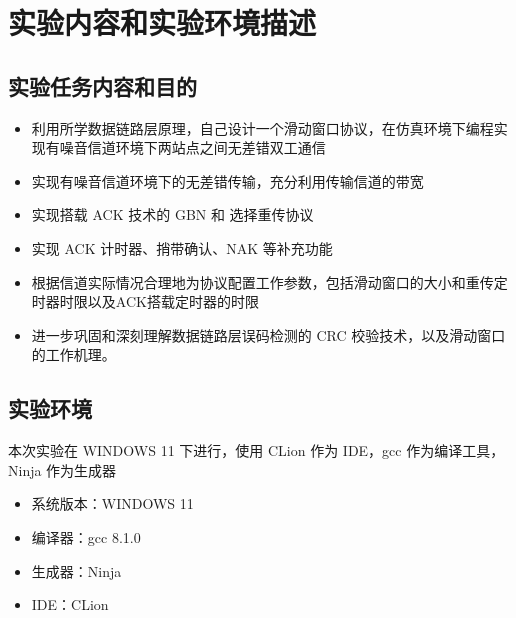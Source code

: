 \section{实验内容和实验环境描述}
    \subsection{实验任务内容和目的}
        \begin{itemize}
            \item 利用所学数据链路层原理，自己设计一个滑动窗口协议，在仿真环境下编程实现有噪音信道环境下两站点之间无差错双工通信
            \item 实现有噪音信道环境下的无差错传输，充分利用传输信道的带宽
            \item 实现搭载 ACK 技术的 GBN 和 选择重传协议
            \item 实现 ACK 计时器、捎带确认、NAK 等补充功能
            \item 根据信道实际情况合理地为协议配置工作参数，包括滑动窗口的大小和重传定时器时限以及ACK搭载定时器的时限
            \item 进一步巩固和深刻理解数据链路层误码检测的 CRC 校验技术，以及滑动窗口的工作机理。
        \end{itemize}

    \subsection{实验环境}
        \par 本次实验在 WINDOWS 11 下进行，使用 CLion 作为 IDE，gcc 作为编译工具，Ninja 作为生成器
        \begin{itemize}
            \item 系统版本：WINDOWS 11
            \item 编译器：gcc 8.1.0
            \item 生成器：Ninja
            \item IDE：CLion
        \end{itemize}


